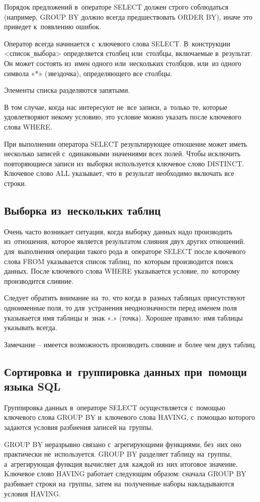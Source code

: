 \documentclass{ou}
\begin{document}
Порядок предложений в~операторе SELECT должен строго соблюдаться (например, GROUP BY должно всегда предшествовать ORDER BY), иначе это приведет к~появлению ошибок. 

Оператор всегда начинается с~ключевого слова SELECT. В~конструкции <список\verb|_|выбора>  определяется столбец или~столбцы, включаемые в~результат. Он может состоять из~имен одного или~нескольких столбцов, или~из одного символа «*» (звездочка), определяющего все столбцы. 

Элементы списка разделяются запятыми. 

В том случае, когда нас интересуют не~все записи, а~только те, которые удовлетворяют некому условию, это условие можно указать после ключевого слова WHERE. 

При выполнении оператора SELECT результирующее отношение может иметь несколько записей с~одинаковыми значениями всех полей. Чтобы исключить повторяющиеся записи из~выборки используется ключевое слово DISTINCT. Ключевое слово ALL указывает, что в~результат необходимо включать все строки.  
 \subsection{Выборка из~нескольких таблиц} 
Очень часто возникает ситуация, когда выборку данных надо производить из~отношения, которое является результатом слияния двух других отношений. для~выполнения операции такого рода в~операторе SELECT после ключевого слова FROM указывается список таблиц, по~которым производится поиск данных. После ключевого слова WHERE указывается условие, по~которому производится слияние. 

Следует обратить внимание на~то, что когда в~разных таблицах присутствуют одноименные поля, то для~устранения неоднозначности перед именем поля указывается имя таблицы и~знак «.» (точка). Хорошее правило: имя таблицы указывать всегда.

Замечание -- имеется возможность производить слияние и~более чем двух таблиц. 
\subsection{Сортировка и~группировка данных при~помощи языка SQL}
Группировка данных в~операторе SELECT осуществляется с~помощью ключевого слова GROUP BY и~ключевого слова HAVING, с~помощью которого задаются условия разбиения записей на~группы.
 
GROUP BY неразрывно связано с~агрегирующими функциями, без~них оно практически не~используется. GROUP BY разделяет таблицу на~группы, а~агрегирующая функция вычисляет для~каждой из~них итоговое значение. Kлючевое слово HAVING работает следующим образом: сначала GROUP BY разбивает строки на~группы, затем на~полученные наборы накладываются условия HAVING. 
 
\end{document}
